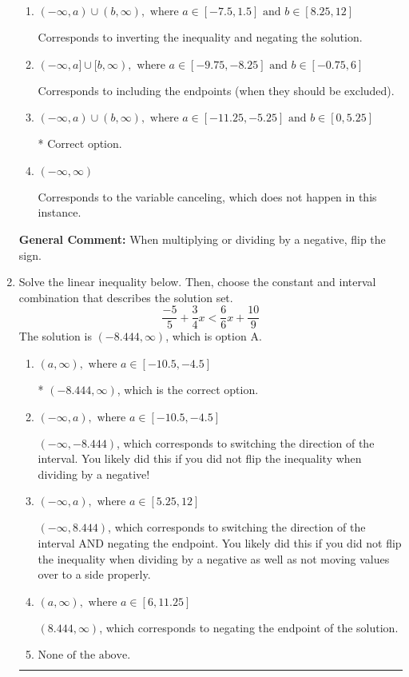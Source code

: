 \documentclass{extbook}[14pt]
\newcommand{\litem}[1]{\item #1

\rule{\textwidth}{0.4pt}}
\begin{document}
\begin{enumerate}
{\begin{enumerate}[label=\Alph*.]
Corresponds to including the endpoints AND negating.
\item \( (-\infty, a) \cup (b, \infty), \text{ where } a \in [-7.5, 1.5] \text{ and } b \in [8.25, 12] \)

Corresponds to inverting the inequality and negating the solution.
\item \( (-\infty, a] \cup [b, \infty), \text{ where } a \in [-9.75, -8.25] \text{ and } b \in [-0.75, 6] \)

Corresponds to including the endpoints (when they should be excluded).
\item \( (-\infty, a) \cup (b, \infty), \text{ where } a \in [-11.25, -5.25] \text{ and } b \in [0, 5.25] \)

 * Correct option.
\item \( (-\infty, \infty) \)

Corresponds to the variable canceling, which does not happen in this instance.
\end{enumerate}

\textbf{General Comment:} When multiplying or dividing by a negative, flip the sign.
}
\litem{
Solve the linear inequality below. Then, choose the constant and interval combination that describes the solution set.
\[ \frac{-5}{5} + \frac{3}{4} x < \frac{6}{6} x + \frac{10}{9} \]The solution is \( (-8.444, \infty) \), which is option A.\begin{enumerate}[label=\Alph*.]
\item \( (a, \infty), \text{ where } a \in [-10.5, -4.5] \)

* $(-8.444, \infty)$, which is the correct option.
\item \( (-\infty, a), \text{ where } a \in [-10.5, -4.5] \)

 $(-\infty, -8.444)$, which corresponds to switching the direction of the interval. You likely did this if you did not flip the inequality when dividing by a negative!
\item \( (-\infty, a), \text{ where } a \in [5.25, 12] \)

 $(-\infty, 8.444)$, which corresponds to switching the direction of the interval AND negating the endpoint. You likely did this if you did not flip the inequality when dividing by a negative as well as not moving values over to a side properly.
\item \( (a, \infty), \text{ where } a \in [6, 11.25] \)

 $(8.444, \infty)$, which corresponds to negating the endpoint of the solution.
\item \( \text{None of the above}. \)


\end{enumerate}}
\end{enumerate}
\end{document}
